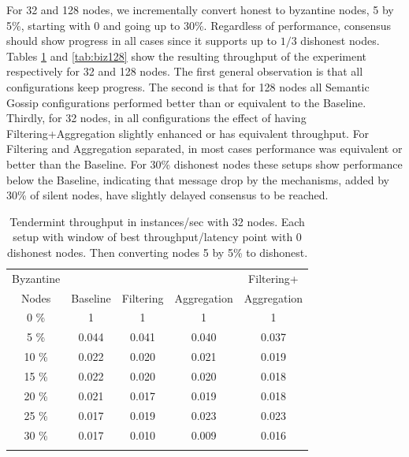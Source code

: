 For 32 and 128 nodes, we incrementally convert honest to byzantine nodes, 5 by 5\%, starting with 0 and going up to 30\%.  Regardless of performance, consensus should show progress in all cases since it supports up to $1/3$ dishonest nodes.  Tables \ref{tab:biz32} and \ref{tab:biz128} show the resulting throughput of the experiment respectively for 32 and 128 nodes.  The first general observation is that all configurations keep progress.   The second is that for 128 nodes all Semantic Gossip configurations performed better than or equivalent to the Baseline.  Thirdly, for 32 nodes, in all configurations the effect of having Filtering+Aggregation slightly enhanced or has equivalent throughput.   For Filtering and Aggregation separated, in most cases performance was equivalent or better than the Baseline.  For 30\% dishonest nodes these setups show performance below the Baseline, indicating that message drop by the mechanisms, added by 30\% of silent nodes, have slightly delayed consensus to be reached.

\begin{table}[h!]
\centering
	\begin{tabular}{c c c c c }
	\hline
     Byzantine     &        &       &       & Filtering+  \\ 
	 Nodes & Baseline   & Filtering    & Aggregation    & Aggregation  \\  \hline
	 0 \%  		    & 		1		&	1	&	1	& 1  \\
	 5 \%  		    & 		0.044		&	0.041	&	0.040	& 0.037  \\
	 10 \%  		& 		0.022		&	0.020	&	0.021	& 0.019  \\
	 15 \%  		& 		0.022		&	0.020	&	0.020	& 0.018  \\
	 20 \%  		& 		0.021		&	0.017	&	0.019	& 0.018  \\
	 25 \%  		& 		0.017		&	0.019	&	0.023	& 0.023  \\
	 30 \%  		& 		0.017		&	0.010	&	0.009	& 0.016  \\ \hline \\
	\end{tabular}
	\caption{Tendermint throughput in instances/sec with 32 nodes. 
 Each setup with window of best throughput/latency point with 0 dishonest nodes.   Then converting nodes 5 by 5\% to dishonest.}
 \label{tab:biz32}
\end{table}


